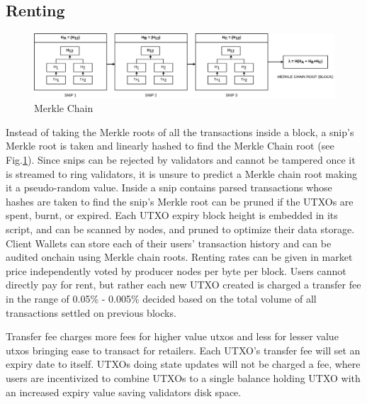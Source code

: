 \documentclass[a4paper,10pt]{article}
\begin{document}
\subsection{Renting}
\begin{figure}[h]
\begin{center}
\includegraphics[width=13cm]{merklechain}
\caption{Merkle Chain}
\label{chain}
\end{center}
\end{figure}
Instead of taking the Merkle roots of all the transactions inside a block, a snip's Merkle root is taken and linearly hashed to find the Merkle Chain root (see Fig.\ref{chain}). Since snips can be rejected by validators and cannot be tampered once it is streamed to ring validators, it is unsure to predict a Merkle chain root making it a pseudo-random value. Inside a snip contains parsed transactions whose hashes are taken to find the snip's Merkle root can be pruned if the UTXOs are spent, burnt, or expired. Each UTXO expiry block height is embedded in its script, and can be scanned by nodes, and pruned to optimize their data storage. Client Wallets can store each of their users' transaction history and can be audited onchain using Merkle chain roots. Renting rates can be given in market price independently voted by producer nodes per byte per block. Users cannot directly pay for rent, but rather each new UTXO created is charged a transfer fee in the range of 0.05\% - 0.005\% decided based on the total volume of all transactions settled on previous blocks.

 Transfer fee charges more fees for higher value utxos and less for lesser value utxos bringing ease to transact for retailers. Each UTXO's transfer fee will set an expiry date to itself. UTXOs doing state updates \cite{stateupdate} will not be charged a fee, where users are incentivized to combine UTXOs to a single balance holding UTXO with an increased expiry value saving validators disk space. 
 
\end{document}
